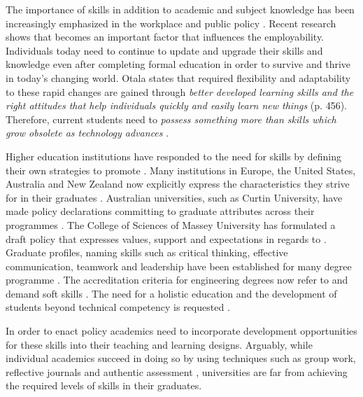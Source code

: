 
The importance of \LLLs skills in addition to academic and subject knowledge has
been increasingly emphasized in the workplace and public policy
\citep{Morgan-Klein2007,Sutherland2006}. Recent research
\citep{Simmons-McDonald2009} shows that \LLLs becomes an important factor that
influences the employability. Individuals today need to continue to update and
upgrade their skills and knowledge even after completing formal education in
order to survive and thrive in today's changing world. Otala
\citeyearpar{Otala1997} states that required flexibility and adaptability to
these rapid changes are gained through \textit{better developed learning skills
and the right attitudes that help individuals quickly and easily learn new
things} (p. 456). Therefore, current students need to \textit{possess something
more than skills which grow obsolete as technology advances}
\cite[p.~195]{Field2003}.

Higher education institutions have responded to the need for \LLLs skills by
defining their own strategies to promote \LLLsn. Many institutions in Europe,
the United States, Australia and New Zealand now explicitly express the \LLLs
characteristics they strive for in their graduates \citep{Scanlon2006}.
Australian universities, such as Curtin University, have made policy
declarations committing to graduate attributes across their programmes
\citep{CurtinUniversity2006}. The College of Sciences of Massey University has
formulated a draft \LLLs policy \citep{MasseyUniversity2008} that expresses
values, support and expectations in regards to \LLLsn. Graduate profiles, naming
\LLLs skills such as critical thinking, effective communication, teamwork and
leadership have been established for many degree programme
\citep{Davies2003,McAlister2003}. The accreditation criteria for engineering
degrees now refer to and demand soft skills \citep{Aller2005,Muffo2001}. The
need for a holistic education and the development of students beyond technical
competency is requested
\citep{Brakke2002,Davies2003,Dowling2006,Fallows2003,Grabowski2004,Hernon2006}.

In order to enact policy academics need to incorporate development opportunities
for these skills into their teaching and learning designs. Arguably, while
individual academics succeed in doing so by using techniques such as group work,
reflective journals and authentic assessment \citep{Clarke2003,Lombardi2008},
universities are far from achieving the required levels of \LLLs skills in their
graduates.

